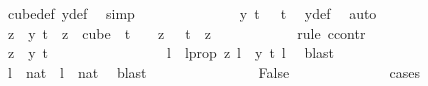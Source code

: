 \begin{isabellebody}
\ cube{\isacharunderscore}{\kern0pt}def\ y{\isacharunderscore}{\kern0pt}def\ \isamarkupfalse%
\ simp\ \isanewline
\ \ \ \ \ \ \ \ \ \ \isamarkupfalse%
\ \isamarkupfalse%
\ {\isachardoublequoteopen}y\ t\ {}\ {\isacharequal}{\kern0pt}\ t{\isachardoublequoteclose}\ \isamarkupfalse%
\ y{\isacharunderscore}{\kern0pt}def\ \isamarkupfalse%
\ auto\isanewline
\ \ \ \ \ \ \ \ \ \ \isamarkupfalse%
\ \isamarkupfalse%
\ {\isachardoublequoteopen}z\ {\isacharequal}{\kern0pt}\ y\ t{\isachardoublequoteclose}\ \ {\isachardoublequoteopen}z\ {\isasymin}\ cube\ {}\ {\isacharparenleft}{\kern0pt}t\ {\isacharplus}{\kern0pt}\ {}{\isacharparenright}{\kern0pt}{\isachardoublequoteclose}\ \ {\isachardoublequoteopen}z\ {}\ {\isacharequal}{\kern0pt}\ t{\isachardoublequoteclose}\ \ z\isanewline
\ \ \ \ \ \ \ \ \ \ \isamarkupfalse%
\ {\isacharparenleft}{\kern0pt}rule\ ccontr{\isacharparenright}{\kern0pt}\isanewline
\ \ \ \ \ \ \ \ \ \ \ \ \isamarkupfalse%
\ {\isachardoublequoteopen}z\ {\isasymnoteq}\ y\ t{\isachardoublequoteclose}\ \isanewline
\ \ \ \ \ \ \ \ \ \ \ \ \isamarkupfalse%
\ \isamarkupfalse%
\ l\ \ l{\isacharunderscore}{\kern0pt}prop{\isacharcolon}{\kern0pt}\ {\isachardoublequoteopen}z\ l\ {\isasymnoteq}\ y\ t\ l{\isachardoublequoteclose}\ \isamarkupfalse%
\ blast\isanewline
\ \ \ \ \ \ \ \ \ \ \ \ \isamarkupfalse%
\ {\isachardoublequoteopen}l\ {\isasymin}\ {\isacharbraceleft}{\kern0pt}{\isachardot}{\kern0pt}{\isachardot}{\kern0pt}{\isacharless}{\kern0pt}{}{\isacharcolon}{\kern0pt}{\isacharcolon}{\kern0pt}nat{\isacharbraceright}{\kern0pt}{\isachardoublequoteclose}\ {\isacharbar}{\kern0pt}\ {\isachardoublequoteopen}l\ {\isasymnotin}\ {\isacharbraceleft}{\kern0pt}{\isachardot}{\kern0pt}{\isachardot}{\kern0pt}{\isacharless}{\kern0pt}{}{\isacharcolon}{\kern0pt}{\isacharcolon}{\kern0pt}nat{\isacharbraceright}{\kern0pt}{\isachardoublequoteclose}\ \isamarkupfalse%
\ blast\isanewline
\ \ \ \ \ \ \ \ \ \ \ \ \isamarkupfalse%
\ \isamarkupfalse%
\ False\isanewline
\ \ \ \ \ \ \ \ \ \ \ \ \isamarkupfalse%
\ cases\isanewline
\ \ \ \ \ \ \ \ \ \ \ \ \ \ \isamarkupfalse%
\ {}\isanewline
\ \ \ \ \ \ \ \ \ \ \ \ \ \ \isamarkupfalse%

\end{isabellebody}
